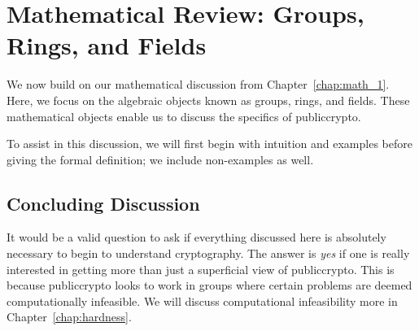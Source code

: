 \chapter{Mathematical Review: Groups, Rings, and Fields}
\label{chap:math_2}

We now build on our mathematical discussion from Chapter~\ref{chap:math_1}.
Here, we focus on the algebraic objects known as \glspl{group},
\glspl{ring}, and \glspl{field}.
These mathematical objects enable us to discuss the specifics
of \gls{publiccrypto}.

To assist in this discussion, we will first begin with intuition
and examples before giving the formal definition;
we include non-examples as well.







\section{Concluding Discussion}
It would be a valid question to ask if everything discussed here
is absolutely necessary to begin to understand cryptography.
The answer is \emph{yes} if one is really interested in getting
more than just a superficial view of \gls{publiccrypto}.
This is because \gls{publiccrypto} looks to work in \glspl{group}
where certain problems are deemed computationally infeasible.
We will discuss computational infeasibility more in Chapter~\ref{chap:hardness}.

